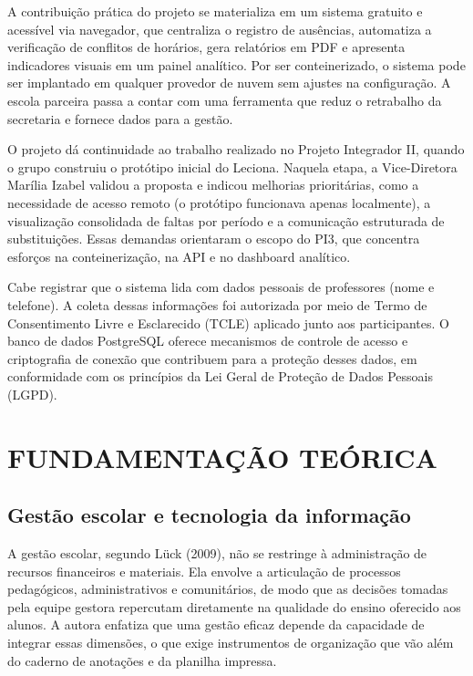 A contribuição prática do projeto se materializa em um sistema gratuito e acessível via navegador, que centraliza o registro de ausências, automatiza a verificação de conflitos de horários, gera relatórios em PDF e apresenta indicadores visuais em um painel analítico. Por ser conteinerizado, o sistema pode ser implantado em qualquer provedor de nuvem sem ajustes na configuração. A escola parceira passa a contar com uma ferramenta que reduz o retrabalho da secretaria e fornece dados para a gestão.

O projeto dá continuidade ao trabalho realizado no Projeto Integrador II, quando o grupo construiu o protótipo inicial do Leciona. Naquela etapa, a Vice-Diretora Marília Izabel validou a proposta e indicou melhorias prioritárias, como a necessidade de acesso remoto (o protótipo funcionava apenas localmente), a visualização consolidada de faltas por período e a comunicação estruturada de substituições. Essas demandas orientaram o escopo do PI3, que concentra esforços na conteinerização, na API e no dashboard analítico.

Cabe registrar que o sistema lida com dados pessoais de professores (nome e telefone). A coleta dessas informações foi autorizada por meio de Termo de Consentimento Livre e Esclarecido (TCLE) aplicado junto aos participantes. O banco de dados PostgreSQL oferece mecanismos de controle de acesso e criptografia de conexão que contribuem para a proteção desses dados, em conformidade com os princípios da Lei Geral de Proteção de Dados Pessoais (LGPD).


\section[Fundamentação teórica]{FUNDAMENTAÇÃO TEÓRICA}

\subsection{Gestão escolar e tecnologia da informação}

A gestão escolar, segundo Lück (2009), não se restringe à administração de recursos financeiros e materiais. Ela envolve a articulação de processos pedagógicos, administrativos e comunitários, de modo que as decisões tomadas pela equipe gestora repercutam diretamente na qualidade do ensino oferecido aos alunos. A autora enfatiza que uma gestão eficaz depende da capacidade de integrar essas dimensões, o que exige instrumentos de organização que vão além do caderno de anotações e da planilha impressa.

